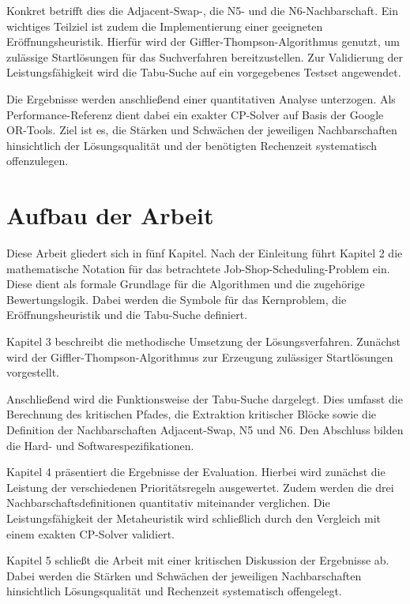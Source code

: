 Konkret betrifft dies die Adjacent-Swap-, die N5- und die N6-Nachbarschaft.
Ein wichtiges Teilziel ist zudem die Implementierung einer geeigneten Eröffnungsheuristik.
Hierfür wird der Giffler-Thompson-Algorithmus genutzt, um zulässige Startlösungen für das Suchverfahren bereitzustellen.
Zur Validierung der Leistungsfähigkeit wird die Tabu-Suche auf ein vorgegebenes Testset angewendet.

Die Ergebnisse werden anschließend einer quantitativen Analyse unterzogen.
Als Performance-Referenz dient dabei ein exakter CP-Solver auf Basis der Google OR-Tools.
Ziel ist es, die Stärken und Schwächen der jeweiligen Nachbarschaften hinsichtlich der Lösungsqualität und der benötigten Rechenzeit systematisch offenzulegen.
\section{Aufbau der Arbeit}
\label{sec:aufbau}
Diese Arbeit gliedert sich in fünf Kapitel.
Nach der Einleitung führt Kapitel 2 die mathematische Notation für das betrachtete Job-Shop-Scheduling-Problem ein.
Diese dient als formale Grundlage für die Algorithmen und die zugehörige Bewertungslogik.
Dabei werden die Symbole für das Kernproblem, die Eröffnungsheuristik und die Tabu-Suche definiert.

Kapitel 3 beschreibt die methodische Umsetzung der Lösungsverfahren.
Zunächst wird der Giffler-Thompson-Algorithmus zur Erzeugung zulässiger Startlösungen vorgestellt.

Anschließend wird die Funktionsweise der Tabu-Suche dargelegt.
Dies umfasst die Berechnung des kritischen Pfades, die Extraktion kritischer Blöcke sowie die Definition der Nachbarschaften Adjacent-Swap, N5 und N6.
Den Abschluss bilden die Hard- und Softwarespezifikationen.

Kapitel 4 präsentiert die Ergebnisse der Evaluation.
Hierbei wird zunächst die Leistung der verschiedenen Prioritätsregeln ausgewertet.
Zudem werden die drei Nachbarschaftsdefinitionen quantitativ miteinander verglichen.
Die Leistungsfähigkeit der Metaheuristik wird schließlich durch den Vergleich mit einem exakten CP-Solver validiert.

Kapitel 5 schließt die Arbeit mit einer kritischen Diskussion der Ergebnisse ab.
Dabei werden die Stärken und Schwächen der jeweiligen Nachbarschaften hinsichtlich Lösungsqualität und Rechenzeit systematisch offengelegt.